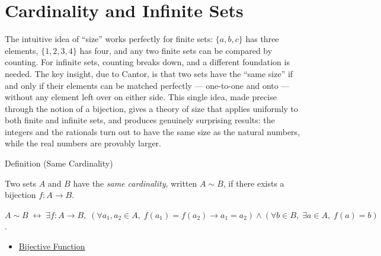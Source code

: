 
\section{Cardinality and Infinite Sets}


\begin{exposition}
The intuitive idea of ``size'' works perfectly for finite sets: $\{a,b,c\}$
has three elements, $\{1,2,3,4\}$ has four, and any two finite sets can be
compared by counting. For infinite sets, counting breaks down, and a
different foundation is needed. The key insight, due to Cantor, is that two
sets have the ``same size'' if and only if their elements can be matched
perfectly — one-to-one and onto — without any element left over on either
side. This single idea, made precise through the notion of a bijection, gives
a theory of size that applies uniformly to both finite and infinite sets, and
produces genuinely surprising results: the integers and the rationals turn out
to have the same size as the natural numbers, while the real numbers are
provably larger.
\end{exposition}


\begin{definitionbox}{Definition (Same Cardinality)}
\begin{definition}\label{def:same-cardinality}
Two sets $A$ and $B$ have the \emph{same cardinality}, written $A \sim B$,
if there exists a bijection $f : A \to B$.
\end{definition}
\end{definitionbox}

\begin{remark*}
$A \sim B \;\leftrightarrow\; \exists f: A\to B,\; (\forall a_1,a_2\in A,\; f(a_1)=f(a_2)\to a_1=a_2) \wedge (\forall b\in B,\; \exists a\in A,\; f(a)=b)$.
\end{remark*}


\begin{dependencies}
\begin{itemize}
  \item \hyperref[def:bijective]{Bijective Function}
\end{itemize}
\end{dependencies}

